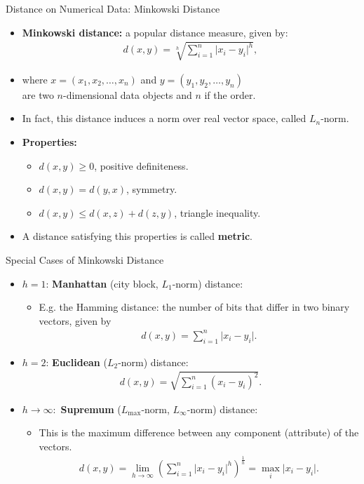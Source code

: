 \begin{frame}{Distance on Numerical Data: Minkowski Distance}
	\begin{itemize}
		\item \textbf{Minkowski distance:} a popular distance measure, given by:
		      \begin{align}
			      d(x,y) = \sqrt[h]{\sum_{i=1}^{n} \vert x_i-y_i \vert^h},
		      \end{align}
		\item where $x = (x_1,x_2, \ldots, x_n)$ and $y = (y_1,y_2,\ldots,y_n)$ \\ are two $n$-dimensional data objects and $n$ if the order.
		\item In fact, this distance induces a norm over real vector space, called $L_n$-norm.
		\item \textbf{Properties:}
		      \begin{itemize}
			      \item $d(x,y) \geq 0$, positive definiteness.
			      \item $d(x,y) = d(y,x)$, symmetry.
			      \item $d(x,y) \leq d(x,z) + d(z,y)$, triangle inequality.
		      \end{itemize}
		\item A distance satisfying this properties is called \textbf{metric}.
	\end{itemize}
\end{frame}

\begin{frame}{Special Cases of Minkowski Distance}
	\begin{itemize}
		\item $h=1$: \textbf{Manhattan} (city block, $L_1$-norm) distance:
		      \begin{itemize}
			      \item E.g. the Hamming distance: the number of bits that differ in two binary vectors, given by
			            \begin{align}
				            d(x,y) = \sum_{i=1}^{n} \vert x_i - y_i \vert.
			            \end{align}
		      \end{itemize}
		\item $h=2$: \textbf{Euclidean} ($L_2$-norm) distance:
		      \begin{align}
			      d(x,y) = \sqrt{\sum_{i=1}^{n} (x_i-y_i)^2}.
		      \end{align}
		\item $h \rightarrow \infty:$ \textbf{Supremum} ($L_{\text{max}}$-norm, $L_\infty$-norm) distance:
		      \begin{itemize}
			      \item This is the maximum difference between any component (attribute) of the vectors.
			            \begin{align}
				            d(x,y) = \lim_{h \rightarrow \infty} \left( \sum_{i=1}^{n} \vert x_i - y_i \vert^{h} \right)^{\frac{1}{h}} = \max_i \vert x_i-y_i \vert.
			            \end{align}
		      \end{itemize}
	\end{itemize}
\end{frame}
